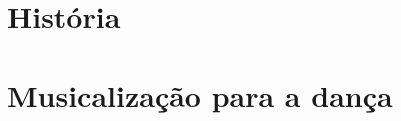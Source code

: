 \documentclass[12pt]{extbook} %
\def \SourceRootPath{.}
\begin{document}


\clearpage
\pagestyle{fancy} %
\tableofcontents %




\cleardoublepage %
\pagestyle{fancy} %


\part{História}




\part{Musicalização para a dança}


\end{document}
